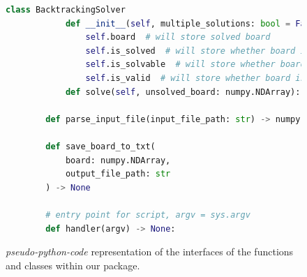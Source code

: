     \begin{figure}[htb]
    \centering
    \begin{lstlisting}[language=Python,label={lst:lstlisting}]
        class BacktrackingSolver
            def __init__(self, multiple_solutions: bool = False):
                self.board  # will store solved board
                self.is_solved  # will store whether board is solved
                self.is_solvable  # will store whether board is solvable
                self.is_valid  # will store whether board is valid
            def solve(self, unsolved_board: numpy.NDArray):

        def parse_input_file(input_file_path: str) -> numpy.NDArray

        def save_board_to_txt(
            board: numpy.NDArray,
            output_file_path: str
        ) -> None

        # entry point for script, argv = sys.argv
        def handler(argv) -> None:
    \end{lstlisting}
    \caption{\textit{pseudo-python-code} representation of the interfaces of the functions and classes within our
     package.}
    \label{fig:pseudocode}
    \end{figure}
